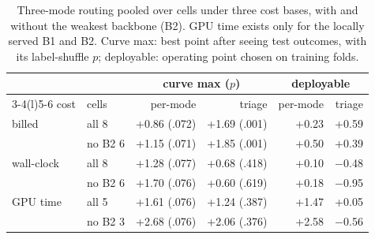 \begin{table}[t]
\centering\scriptsize
\setlength{\tabcolsep}{3pt}
\begin{tabular}{@{}llrrrr@{}}
\toprule
 & & \multicolumn{2}{c}{curve max ($p$)} & \multicolumn{2}{c}{deployable} \\
\cmidrule(lr){3-4}\cmidrule(l){5-6}
cost & cells & per-mode & triage & per-mode & triage \\
\midrule
billed & all 8 & +0.86 (.072) & +1.69 (.001) & +0.23 & +0.59 \\
 & no B2 6 & +1.15 (.071) & +1.85 (.001) & +0.50 & +0.39 \\
\addlinespace[2pt]
wall-clock & all 8 & +1.28 (.077) & +0.68 (.418) & +0.10 & $-$0.48 \\
 & no B2 6 & +1.70 (.076) & +0.60 (.619) & +0.18 & $-$0.95 \\
\addlinespace[2pt]
GPU time & all 5 & +1.61 (.076) & +1.24 (.387) & +1.47 & +0.05 \\
 & no B2 3 & +2.68 (.076) & +2.06 (.376) & +2.58 & $-$0.56 \\
\bottomrule
\end{tabular}
\caption{Three-mode routing pooled over cells under three cost bases, with and without the weakest backbone (B2). GPU time exists only for the locally served B1 and B2. Curve max: best point after seeing test outcomes, with its label-shuffle $p$; deployable: operating point chosen on training folds.}
\label{tab:sens}
\end{table}
